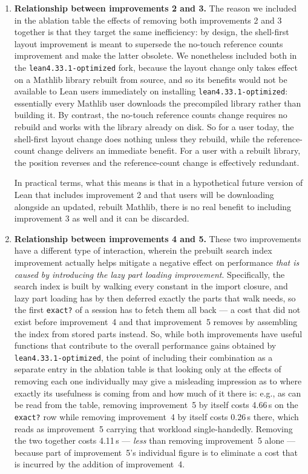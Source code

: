 \documentclass{article}
\newcommand{\Lean}{Lean\xspace}      %
\newcommand{\mathlib}{Mathlib\xspace}
\newcommand{\altlean}{\texttt{lean4.33.1-\allowbreak optimized}\xspace}
\begin{document}
\begin{enumerate}

\item \textbf{Relationship between improvements 2 and 3. }
The reason we included in the ablation table the effects of removing both improvements 2 and 3 together is that they target the same inefficiency: by design, the shell-first layout improvement is meant to supersede the no-touch reference counts improvement and make the latter obsolete. 
We nonetheless included both in the \altlean fork, because the layout change only takes effect on a \mathlib library rebuilt from source, and so its benefits would not be available to \Lean users immediately on installing \altlean: essentially every \mathlib user downloads the precompiled library rather than building it. By contrast, the no-touch reference counts change requires no rebuild and works with the library already on disk. So for a user today, the shell-first layout change does nothing unless they rebuild, while the reference-count change delivers an immediate benefit. For a user with a rebuilt library, the position reverses and the reference-count change is effectively redundant.

In practical terms, what this means is that in a hypothetical future version of \Lean that includes improvement 2 and that users will be downloading alongside an updated, rebuilt \mathlib, there is no real benefit to including improvement 3 as well and it can be discarded.

\item \textbf{Relationship between improvements 4 and 5.} These two improvements have a different type of interaction, wherein the prebuilt search index improvement actually helps mitigate a negative effect on performance \emph{that is caused by introducing the lazy part loading improvement}. Specifically, the search index is built by walking every constant in the import closure, and lazy part loading has by then deferred exactly the parts that walk needs, so the first \texttt{exact?} of a session has to fetch them all back --- a cost that did not exist before improvement~4 and that improvement~5 removes by assembling the index from stored parts instead. So, while both improvements have useful functions that contribute to the overall performance gains obtained by \altlean, the point of including their combination as a separate entry in the ablation table is that looking only at the effects of removing each one individually may give a misleading impression as to where exactly its usefulness is coming from and how much of it there is: e.g., as can be read from the table, removing improvement~5 by itself costs 4.66\,s on the \texttt{exact?} row while removing improvement~4 by itself costs 0.26\,s there, which reads as improvement~5 carrying that workload single-handedly. Removing the two together costs 4.11\,s --- \emph{less} than removing improvement~5 alone --- because part of improvement~5's individual figure is to eliminate a cost that is incurred by the addition of improvement~4.


\end{enumerate}
\end{document}
